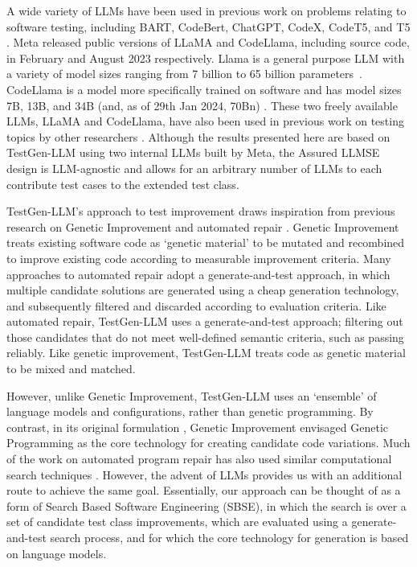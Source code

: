 \documentclass[sigconf,screen]{acmart}
\begin{document}
A wide variety of LLMs have been used in previous work on problems relating to software testing, including
BART,
CodeBert,
ChatGPT,
CodeX,
CodeT5,
and
T5 \cite{wang:llm-test-survey,mhetal:LLM-survey}.
Meta released  public versions of LLaMA and CodeLlama, including source code,  in February and August 2023 respectively.
Llama is a general purpose LLM with a variety of model sizes ranging from 7 billion to 65 billion parameters~\cite{touvron:llama}.
CodeLlama is a model more specifically trained on software and has model sizes 7B, 13B, and 34B (and, as of 29th Jan 2024, 70Bn) \cite{codeLlama}.
These two freely available LLMs, LLaMA and CodeLlama, have also been used in previous work on testing topics by other researchers \cite{moon:coffee,xia2023universal}.
Although the results presented here are based on  TestGen-LLM using two internal LLMs built by Meta, the Assured LLMSE design is LLM-agnostic and  allows for an arbitrary number of LLMs to each contribute test cases to the extended test class.



TestGen-LLM's approach to test improvement  draws inspiration from previous research on Genetic Improvement\cite{Petke:gisurvey} and automated repair \cite{legoues:cacm-survey}.
Genetic Improvement  treats existing software code as `genetic material' to be mutated and recombined to improve existing code according to measurable improvement criteria.
Many approaches to automated repair 
adopt a generate-and-test approach, in which multiple candidate solutions are generated using a cheap generation technology, and subsequently filtered and discarded according to evaluation criteria.
Like automated repair, TestGen-LLM uses a generate-and-test approach; filtering out those candidates that do not meet well-defined semantic criteria, such as passing reliably.
Like genetic improvement, TestGen-LLM treats code as genetic material to be mixed and matched. 

However, unlike Genetic Improvement, TestGen-LLM uses an `ensemble' of language models and configurations, rather than genetic programming.
By contrast, in its original formulation \cite{blmh:tec1}, Genetic Improvement envisaged Genetic Programming as the core technology for creating candidate code variations. 
Much of the work on automated program repair has also used similar computational search techniques \cite{legoues:cacm-survey}.
However, the advent of LLMs provides us with an additional route to achieve the same goal.
Essentially, our approach can be thought of as a form of Search Based Software Engineering (SBSE)\cite{mhbj:manifesto,mhamyz:acm-surveys}, in which the search is over a set of candidate test class improvements, which are evaluated using a generate-and-test search process, and for which the core technology for generation is based on language models.
\end{document}
